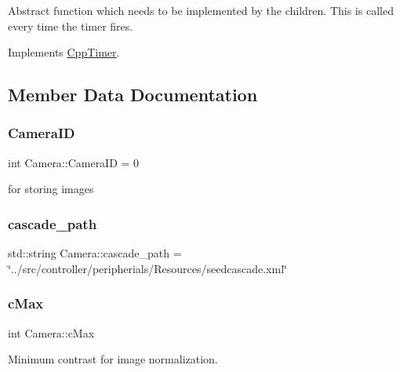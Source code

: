 Abstract function which needs to be implemented by the children. This is called every time the timer fires. 

Implements \hyperlink{classCppTimer_ac2665403595b6aee5f581d0ebfeb886c}{Cpp\+Timer}.



\subsection{Member Data Documentation}
\mbox{\label{classCamera_a96c19741cb6ba7a897ca90746e8b8918}} 
\subsubsection{\texorpdfstring{Camera\+ID}{CameraID}}
{\footnotesize\ttfamily int Camera\+::\+Camera\+ID = 0\hspace{0.3cm}{\ttfamily [private]}}



for storing images 

\mbox{\label{classCamera_a7f9dcee329ab710d227afa3eb8f6e4a3}} 
\subsubsection{\texorpdfstring{cascade\+\_\+path}{cascade\_path}}
{\footnotesize\ttfamily std\+::string Camera\+::cascade\+\_\+path = \char`\"{}../src/controller/peripherials/Resources/seedcascade.\+xml\char`\"{}\hspace{0.3cm}{\ttfamily [private]}}

\mbox{\label{classCamera_ad784af65b7f7e1b6ebb9b33df774d7db}} 
\subsubsection{\texorpdfstring{c\+Max}{cMax}}
{\footnotesize\ttfamily int Camera\+::c\+Max\hspace{0.3cm}{\ttfamily [private]}}



Minimum contrast for image normalization. 

